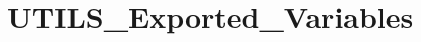 \hypertarget{group___u_t_i_l_s___exported___variables}{}\section{U\+T\+I\+L\+S\+\_\+\+Exported\+\_\+\+Variables}
\label{group___u_t_i_l_s___exported___variables}
